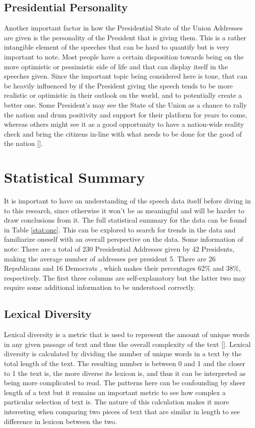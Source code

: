 \subsection{Presidential Personality}
Another important factor in how the Presidential State of the Union Addresses are given is the personality of the President that is giving them.
This is a rather intangible element of the speeches that can be hard to quantify but is very important to note.
Most people have a certain disposition towards being on the more optimistic or pessimistic side of life and that can display itself in the speeches given.
Since the important topic being considered here is tone, that can be heavily influenced by if the President giving the speech tends to be more realistic or optimistic in their outlook on the world, and to potentially create a better one.
Some President's may see the State of the Union as a chance to rally the nation and drum positivity and support for their platform for years to come, whereas others might see it as a good opportunity to have a nation-wide reality check and bring the citizens in-line with what needs to be done for the good of the nation [\cite{teten2003evolution}].

\section{Statistical Summary}
It is important to have an understanding of the speech data itself before diving in to this research, since otherwise it won't be as meaningful and will be harder to draw conclusions from it.
The full statistical summary for the data can be found in Table \ref{stat:one}.
This can be explored to search for trends in the data and familiarize oneself with an overall perspective on the data.
Some information of note: 
There are a total of 230 Presidential Addresses given by 42 Presidents, making the average number of addresses per president 5. 
There are 26 Republicans and 16 Democrats , which makes their percentages 62\% and 38\%, respectively.
The first three columns are self-explanatory but the latter two may require some additional information to be understood correctly.

\subsection{Lexical Diversity}
Lexical diversity is a metric that is used to represent the amount of unique words in any given passage of text and thus the overall complexity of the text [\cite{johansson2009lexical}].
Lexical diversity is calculated by dividing the number of unique words in a text by the total length of the text.
The resulting number is between 0 and 1 and the closer to 1 the text is, the more diverse its lexicon is, and thus it can be interpreted as being more complicated to read.
The patterns here can be confounding by sheer length of a text but it remains an important metric to see how complex a particular selection of text is.
The nature of this calculation makes it more interesting when comparing two pieces of text that are similar in length to see difference in lexicon between the two.

